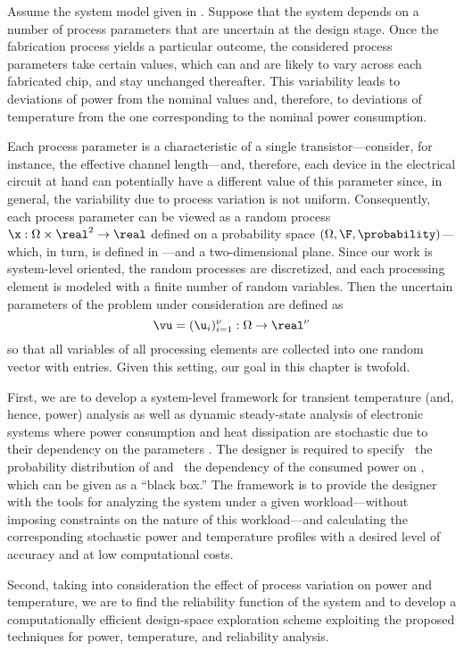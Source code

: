 Assume the system model given in . Suppose that the system
depends on a number of process parameters that are uncertain at the design
stage. Once the fabrication process yields a particular outcome, the considered
process parameters take certain values, which can and are likely to vary across
each fabricated chip, and stay unchanged thereafter. This variability leads to
deviations of power from the nominal values and, therefore, to deviations of
temperature from the one corresponding to the nominal power consumption.

Each process parameter is a characteristic of a single transistor---consider,
for instance, the effective channel length---and, therefore, each device in the
electrical circuit at hand can potentially have a different value of this
parameter since, in general, the variability due to process variation is not
uniform. Consequently, each process parameter can be viewed as a random process
$\x: \Omega \times \real^2 \to \real$ defined on a probability space $(\Omega,
\F, \probability)$---which, in turn, is defined in
---and a two-dimensional plane. Since our work is
system-level oriented, the random processes are discretized, and each processing
element is modeled with a finite number of random variables. Then the uncertain
parameters of the problem under consideration are defined as
\[
  \vu = (\u_i)_{i = 1}^\nu: \Omega \to \real^\nu
\]
so that all variables of all processing elements are collected into one random
vector with \nu entries. Given this setting, our goal in this chapter is
twofold.

First, we are to develop a system-level framework for transient temperature
(and, hence, power) analysis as well as dynamic steady-state analysis of
electronic systems where power consumption and heat dissipation are stochastic
due to their dependency on the parameters \vu. The designer is required to
specify \one~the probability distribution of \vu and \two~the dependency of the
consumed power on \vu, which can be given as a ``black box.'' The framework is
to provide the designer with the tools for analyzing the system under a given
workload---without imposing constraints on the nature of this workload---and
calculating the corresponding stochastic power \mp and temperature \mq profiles
with a desired level of accuracy and at low computational costs.

Second, taking into consideration the effect of process variation on power and
temperature, we are to find the reliability function of the system and to
develop a computationally efficient design-space exploration scheme exploiting
the proposed techniques for power, temperature, and reliability analysis.
